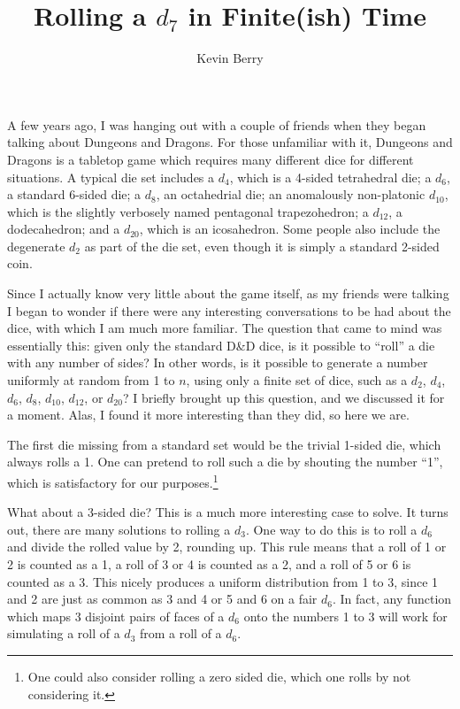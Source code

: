 \documentclass{article}
\title{Rolling a $d_7$ in Finite(ish) Time}
\author{Kevin Berry}
\begin{document}
\maketitle

\par A few years ago, I was hanging out with a couple of friends when they began talking about Dungeons and Dragons.
For those unfamiliar with it, Dungeons and Dragons is a tabletop game which requires many different dice for different situations. 
A typical die set includes a $d_4$, which is a 4-sided tetrahedral die; a $d_6$, a standard 6-sided die; a $d_8$, an octahedrial die; an anomalously non-platonic $d_{10}$, which is the slightly verbosely named pentagonal trapezohedron; a $d_{12}$, a dodecahedron; and a $d_{20}$, which is an icosahedron.
Some people also include the degenerate $d_2$ as part of the die set, even though it is simply a standard 2-sided coin.

\par Since I actually know very little about the game itself, as my friends were talking I began to wonder if there were any interesting conversations to be had about the dice, with which I am much more familiar.
The question that came to mind was essentially this: given only the standard D\&D dice, is it possible to ``roll'' a die with any number of sides? 
In other words, is it possible to generate a number uniformly at random from 1 to $n$, using only a finite set of dice, such as a $d_2$, $d_4$, $d_6$, $d_8$, $d_{10}$, $d_{12}$, or $d_{20}$?
I briefly brought up this question, and we discussed it for a moment.
Alas, I found it more interesting than they did, so here we are.

\par The first die missing from a standard set would be the trivial 1-sided die, which always rolls a 1.
One can pretend to roll such a die by shouting the number ``1'', which is satisfactory for our purposes.\footnote{One could also consider rolling a zero sided die, which one rolls by not considering it.}

\par What about a 3-sided die?
This is a much more interesting case to solve.
It turns out, there are many solutions to rolling a $d_3$.
One way to do this is to roll a $d_6$ and divide the rolled value by 2, rounding up.
This rule means that a roll of 1 or 2 is counted as a 1, a roll of 3 or 4 is counted as a 2, and a roll of 5 or 6 is counted as a 3.
This nicely produces a uniform distribution from 1 to 3, since 1 and 2 are just as common as 3 and 4 or 5 and 6 on a fair $d_6$.
In fact, any function which maps 3 disjoint pairs of faces of a $d_6$ onto the numbers 1 to 3 will work for simulating a roll of a $d_3$ from a roll of a $d_6$.
\end{document}
